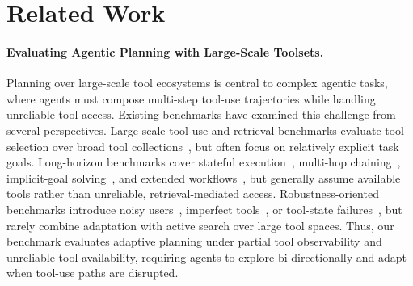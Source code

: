 \section{Related Work}



\paragraph{Evaluating Agentic Planning with Large-Scale Toolsets.}







Planning over large-scale tool ecosystems is central to complex agentic tasks, where agents must compose multi-step tool-use trajectories while handling unreliable tool access. 
Existing benchmarks have examined this challenge from several perspectives. 
Large-scale tool-use and retrieval benchmarks evaluate tool selection over broad tool collections~\citep{ToolBench,APIBench,API-Bank,ToolRet,MCP-Bench,LiveMCPBench}, but often focus on relatively explicit task goals. 
Long-horizon benchmarks cover stateful execution~\citep{ToolSandbox}, multi-hop chaining~\citep{ToolHop}, implicit-goal solving~\citep{EscapeBench}, and extended workflows~\citep{Tool-Decathlon}, but generally assume available tools rather than unreliable, retrieval-mediated access.
Robustness-oriented benchmarks introduce noisy users~\citep{AgentNoiseBench,UserBench}, imperfect tools~\citep{OpaqueToolsBench,ToolQA-D}, or tool-state failures~\citep{ToolGym,CostBench}, but rarely combine adaptation with active search over large tool spaces. 
Thus, our benchmark evaluates adaptive planning under partial tool observability and unreliable tool availability, requiring agents to explore bi-directionally and adapt when tool-use paths are disrupted.

